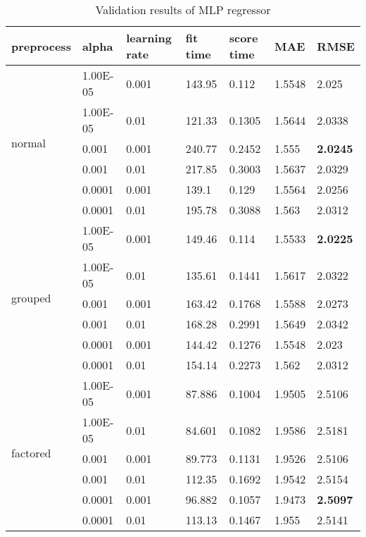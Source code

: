 \begin{table}[H]
    \centering
    \begin{tabular}{lll|llll}
    \toprule
    \textbf{preprocess}      & \textbf{alpha} & \textbf{learning rate} & \textbf{fit time} & \textbf{score time} & \textbf{MAE} & \textbf{RMSE}   \\ \midrule
    \multirow{6}{*}{normal}   & 1.00E-05 & 0.001 & 143.95 & 0.112  & 1.5548 & 2.025           \\
                              & 1.00E-05 & 0.01  & 121.33 & 0.1305 & 1.5644 & 2.0338          \\
                              & 0.001    & 0.001 & 240.77 & 0.2452 & 1.555  & \textbf{2.0245} \\
                              & 0.001    & 0.01  & 217.85 & 0.3003 & 1.5637 & 2.0329          \\
                              & 0.0001   & 0.001 & 139.1  & 0.129  & 1.5564 & 2.0256          \\
                              & 0.0001   & 0.01  & 195.78 & 0.3088 & 1.563  & 2.0312          \\
                              \midrule
    \multirow{6}{*}{grouped} & 1.00E-05       & 0.001                  & 149.46            & 0.114               & 1.5533       & \textbf{2.0225} \\
                              & 1.00E-05 & 0.01  & 135.61 & 0.1441 & 1.5617 & 2.0322          \\
                              & 0.001    & 0.001 & 163.42 & 0.1768 & 1.5588 & 2.0273          \\
                              & 0.001    & 0.01  & 168.28 & 0.2991 & 1.5649 & 2.0342          \\
                              & 0.0001   & 0.001 & 144.42 & 0.1276 & 1.5548 & 2.023           \\
                              & 0.0001   & 0.01  & 154.14 & 0.2273 & 1.562  & 2.0312          \\
                              \midrule
    \multirow{6}{*}{factored} & 1.00E-05 & 0.001 & 87.886 & 0.1004 & 1.9505 & 2.5106          \\
                              & 1.00E-05 & 0.01  & 84.601 & 0.1082 & 1.9586 & 2.5181          \\
                              & 0.001    & 0.001 & 89.773 & 0.1131 & 1.9526 & 2.5106          \\
                              & 0.001    & 0.01  & 112.35 & 0.1692 & 1.9542 & 2.5154          \\
                              & 0.0001   & 0.001 & 96.882 & 0.1057 & 1.9473 & \textbf{2.5097} \\
                              & 0.0001   & 0.01  & 113.13 & 0.1467 & 1.955  & 2.5141        \\     
    \bottomrule
    \end{tabular}
    \caption{Validation results of MLP regressor}
    \label{tab:val_mlp}
    \end{table}
